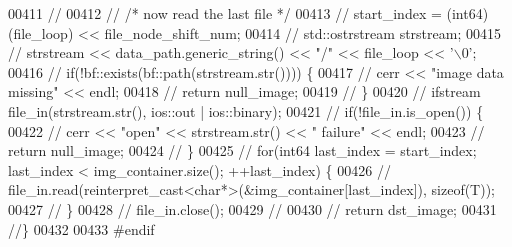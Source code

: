 \begin{DoxyCode}
00411 \textcolor{comment}{//}
00412 \textcolor{comment}{//      /* now read the last file */}
00413 \textcolor{comment}{//      start\_index = (int64)(file\_loop) << file\_node\_shift\_num;}
00414 \textcolor{comment}{//      std::ostrstream strstream;}
00415 \textcolor{comment}{//      strstream << data\_path.generic\_string() << "/" << file\_loop << '\(\backslash\)0';}
00416 \textcolor{comment}{//      if(!bf::exists(bf::path(strstream.str()))) \{}
00417 \textcolor{comment}{//              cerr << "image data missing" << endl;}
00418 \textcolor{comment}{//              return null\_image;}
00419 \textcolor{comment}{//      \}}
00420 \textcolor{comment}{//      ifstream file\_in(strstream.str(), ios::out | ios::binary);}
00421 \textcolor{comment}{//      if(!file\_in.is\_open()) \{}
00422 \textcolor{comment}{//              cerr << "open" << strstream.str() << " failure" << endl;}
00423 \textcolor{comment}{//              return null\_image;}
00424 \textcolor{comment}{//      \}}
00425 \textcolor{comment}{//      for(int64 last\_index = start\_index; last\_index < img\_container.size();
       ++last\_index) \{}
00426 \textcolor{comment}{//              
      file\_in.read(reinterpret\_cast<char*>(&img\_container[last\_index]), sizeof(T));}
00427 \textcolor{comment}{//      \}}
00428 \textcolor{comment}{//      file\_in.close();}
00429 \textcolor{comment}{//}
00430 \textcolor{comment}{//      return dst\_image;}
00431 \textcolor{comment}{//\}}
00432 
00433 \textcolor{preprocessor}{#endif}
\end{DoxyCode}
